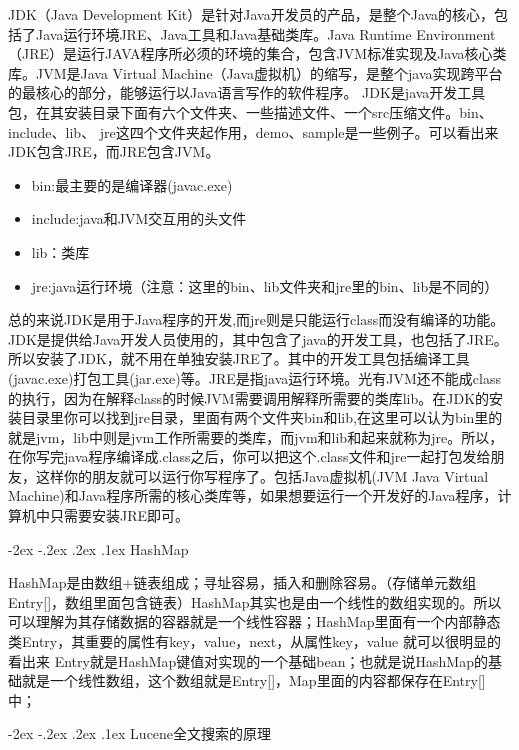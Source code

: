 \documentclass[8pt]{book}
\makeatletter
\numberwithin{dummy}{section}
\theoremstyle{ocrenumbox}
\theoremstyle{blacknumex}
\theoremstyle{blacknumbox}
\theoremstyle{ocrenum}
\renewcommand\paragraph{\@startsection{paragraph}{4}{\z@}
	{-2ex \@plus-.2ex \@minus .2ex}
	{.1ex}
	{\normalfont\small\sffamily\bfseries}}
\makeatother
\begin{document}
JDK（Java Development Kit）是针对Java开发员的产品，是整个Java的核心，包括了Java运行环境JRE、Java工具和Java基础类库。Java Runtime Environment（JRE）是运行JAVA程序所必须的环境的集合，包含JVM标准实现及Java核心类库。JVM是Java Virtual Machine（Java虚拟机）的缩写，是整个java实现跨平台的最核心的部分，能够运行以Java语言写作的软件程序。
JDK是java开发工具包，在其安装目录下面有六个文件夹、一些描述文件、一个src压缩文件。bin、include、lib、 jre这四个文件夹起作用，demo、sample是一些例子。可以看出来JDK包含JRE，而JRE包含JVM。

\begin{itemize}
	\item{bin:最主要的是编译器(javac.exe)}
	\item{include:java和JVM交互用的头文件}
	\item{lib：类库}
	\item{jre:java运行环境（注意：这里的bin、lib文件夹和jre里的bin、lib是不同的）}
\end{itemize}

总的来说JDK是用于Java程序的开发,而jre则是只能运行class而没有编译的功能。JDK是提供给Java开发人员使用的，其中包含了java的开发工具，也包括了JRE。所以安装了JDK，就不用在单独安装JRE了。其中的开发工具包括编译工具(javac.exe)打包工具(jar.exe)等。JRE是指java运行环境。光有JVM还不能成class的执行，因为在解释class的时候JVM需要调用解释所需要的类库lib。在JDK的安装目录里你可以找到jre目录，里面有两个文件夹bin和lib,在这里可以认为bin里的就是jvm，lib中则是jvm工作所需要的类库，而jvm和lib和起来就称为jre。所以，在你写完java程序编译成.class之后，你可以把这个.class文件和jre一起打包发给朋友，这样你的朋友就可以运行你写程序了。包括Java虚拟机(JVM Java Virtual Machine)和Java程序所需的核心类库等，如果想要运行一个开发好的Java程序，计算机中只需要安装JRE即可。

\paragraph{HashMap}

HashMap是由数组+链表组成；寻址容易，插入和删除容易。（存储单元数组Entry[]，数组里面包含链表）HashMap其实也是由一个线性的数组实现的。所以可以理解为其存储数据的容器就是一个线性容器；HashMap里面有一个内部静态类Entry，其重要的属性有key，value，next，从属性key，value 就可以很明显的看出来 Entry就是HashMap键值对实现的一个基础bean；也就是说HashMap的基础就是一个线性数组，这个数组就是Entry[]，Map里面的内容都保存在Entry[]中；

\paragraph{Lucene全文搜索的原理}
\end{document}
